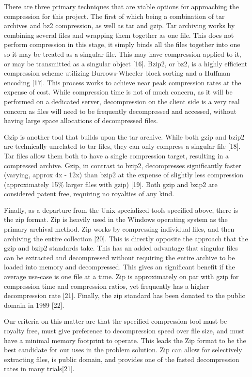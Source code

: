 \documentclass[letterpaper, 10pt,titlepage]{article}
\begin{document}
There are three primary techniques that are viable options for approaching the compression for this project. The first of which being a combination of tar archives and bz2 compression, as well as tar and gzip. Tar archiving works by combining several files and wrapping them together as one file. This does not perform compression in this stage, it simply binds all the files together into one so it may be treated as a singular file. This may have compression applied to it, or may be transmitted as a singular object [16]. Bzip2, or bz2, is a highly efficient compression scheme utilizing Burrows-Wheeler block sorting and a Huffman encoding [17]. This process works to achieve near peak compression rates at the expense of cost. While compression time is not of much concern, as it will be performed on a dedicated server, decompression on the client side is a very real concern as files will need to be frequently decompressed and accessed, without having large space allocations of decompressed files.


Gzip is another tool that builds upon the tar archive. While both gzip and bzip2 are technically unrelated to tar files, they can only compress a singular file  [18]. Tar files allow them both to have a single compression target, resulting in a compressed archive. Gzip, in contrast to bzip2, decompresses significantly faster (varying, approx 4x - 12x) than bzip2 at the expense of slightly less compression (approximately 15\% larger files with gzip) [19]. Both gzip and bzip2 are considered patent free, requiring no royalties of any kind. 


Finally, as a departure from the Unix specialized tools specified above, there is the zip format. Zip is heavily used in the Windows operating system as the primary archival method. Zip works by compressing individual files, and then archiving the entire collection [20]. This is directly opposite the approach that the gzip and bzip2 standards take. This has an added advantage that singular files can be extracted and decompressed without requiring the entire archive to be loaded into memory and decompressed. This gives an significant benefit if the average use-case is one file at a time. Zip is approximately on par with gzip for compression time and compression ratios, yet frequently has a higher decompression rate [21]. Finally, the zip standard has been donated to the public domain in 1989 [22].


Our criteria on this matter are that the specified compression tool must be royalty free, must give preference to decompression speed over file size, and must have a minimal memory footprint to operate. This leads the Zip format to be the best candidate for our uses in the problem solution. Zip can allow for selectively extracting files, is public domain, and provides one of the fasted decompression rates in many trials[21]. 
\end{document}
